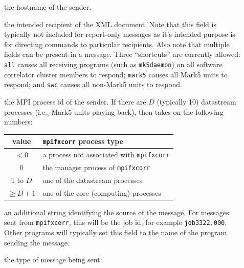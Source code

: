\begin{description}

\item[] the hostname of the sender.
\item[] the intended recipient of the XML document.
Note that this field is typically not included for report-only messages as it's intended purpose is for directing commands to particular recipients.
Also note that multiple  fields can be present in a message.
Three ``shortcuts'' are currently allowed: {\tt all} causes all receiving programs (such as {\tt mk5daemon}) on all software correlator cluster members to respond; {\tt mark5} causes all Mark5 units to respond; and {\tt swc} causes all non-Mark5 units to respond.
\item[] the MPI process id of the sender.  
If there are $D$ (typically 10) datastream processes (i.e., Mark5 units playing back), then  takes on the following numbers:

\begin{tabular}{cl}
value    & {\tt mpifxcorr} process type \\
\hline
$< 0$    & a process not associated with {\tt mpifxcorr} \\
$0$      & the manager process of {\tt mpifxcorr} \\
1 to $D$ & one of the datastream processes \\
$\ge D+1$  & one of the core (computing) processes 
\end{tabular}

\item[] an additional string identifying the source of the message.  
For messages sent from {\tt mpifxcorr}, this will be the job id, for example {\tt job3322.000}.  
Other programs will typically set this field to the name of the program sending the message. 
\item[] the type of message being sent:


\end{description}
